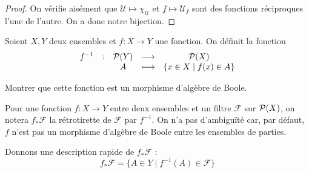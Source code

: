 \begin{proof}
  On vérifie aisément que $\mathcal U \mapsto \chi_\mathcal U$ et
  $f\mapsto \mathcal U_f$ sont des fonctions réciproques l'une de l'autre.
  On a donc notre bijection.
\end{proof}

\begin{exercise}
  Soient $X,Y$ deux ensembles et $f : X \to Y$ une fonction. On définit la
  fonction
  \[\begin{array}{ccccc}
  f^{-1} & : & \mathcal{P}(Y) & \longrightarrow & \mathcal{P}(X)\\
  & & A & \longmapsto & \{x\in X \mid f(x) \in A\}
  \end{array}\]

  Montrer que cette fonction est un morphisme d'algèbre de Boole.
\end{exercise}

\begin{notation}
  Pour une fonction $f : X \to Y$ entre deux ensembles et un filtre $\mathcal F$
  sur $\mathcal{P}(X)$, on notera $f_*\mathcal F$ la rétrotirette de $\mathcal F$
  par $f^{-1}$. On n'a pas d'ambiguïté car, par défaut, $f$ n'est pas un
  morphisme d'algèbre de Boole entre les ensembles de parties.

  Donnons une description rapide de $f_*\mathcal F$ :
  \[f_*\mathcal F = \{A \in Y \mid f^{-1}(A) \in \mathcal F\}\]
\end{notation}
